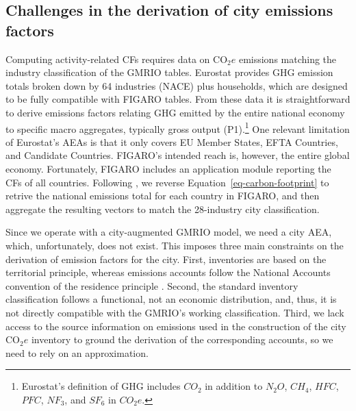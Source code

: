 \documentclass[
  10pt,
  twocolumn]{aft}
\begin{document}
\subsection{Challenges in the derivation of city emissions
factors}\label{sec-method-emissions}

Computing activity-related CFs requires data on \(\text{CO}_2e\)
emissions matching the industry classification of the GMRIO tables.
Eurostat provides GHG emission totals broken down by 64 industries
(NACE) plus households, which are designed to be fully compatible with
FIGARO tables. From these data it is straightforward to derive emissions
factors relating GHG emitted by the entire national economy to specific
macro aggregates, typically gross output (P1).\footnote{Eurostat's
  definition of GHG includes \(CO_2\) in addition to \(N_2O\), \(CH_4\),
  \(HFC\), \(PFC\), \(NF_3\), and \(SF_6\) in \(CO_2e\).} One relevant
limitation of Eurostat's AEAs is that it only covers EU Member States,
EFTA Countries, and Candidate Countries. FIGARO's intended reach is,
however, the entire global economy. Fortunately, FIGARO includes an
application module reporting the CFs of all countries. Following
\citet{corcoles_carbon_2024}, we reverse
Equation~\ref{eq-carbon-footprint} to retrive the national emissions
total for each country in FIGARO, and then aggregate the resulting
vectors to match the 28-industry city classification.

Since we operate with a city-augmented GMRIO model, we need a city AEA,
which, unfortunately, does not exist. This imposes three main
constraints on the derivation of emission factors for the city. First,
inventories are based on the territorial principle, whereas emissions
accounts follow the National Accounts convention of the residence
principle \citep{eurostat_manual_2015}. Second, the standard inventory
classification follows a functional, not an economic distribution, and,
thus, it is not directly compatible with the GMRIO's working
classification. Third, we lack access to the source information on
emissions used in the construction of the city \(\text{CO}_2e\)
inventory to ground the derivation of the corresponding accounts, so we
need to rely on an approximation.
\end{document}
